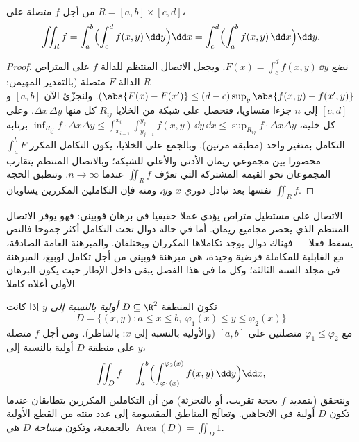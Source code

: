 \begin{theorem}\label{thm:b2:multint:fubini}
من أجل $f$ متصلة على $R = [a,b] \times [c,d]$،
\[
\iint_R f
= \int_a^b \Bigl(\int_c^d f(x, y)\,\dd y\Bigr)\dd x
= \int_c^d \Bigl(\int_a^b f(x, y)\,\dd x\Bigr)\dd y .
\]
\end{theorem}

\begin{proof}
نضع $F(x) = \int_c^d f(x, y)\,\dd y$. ويجعل الاتصال المنتظم للدالة $f$ على المتراص
$R$ الدالة $F$ متصلة (بالتقدير المهيمن: $\abs{F(x) - F(x')} \leq (d - c)\sup_y\abs{f(x,y) - f(x',y)}$).
ولنجزّئ الآن $[a,b]$ و$[c,d]$ إلى $n$ جزءا متساويا، فنحصل على شبكة
من الخلايا $R_{ij}$  كل منها $\Delta x\,\Delta y$. وعلى كل خلية، $\inf_{R_{ij}} f \cdot \Delta x \Delta y \leq
\int_{x_{i-1}}^{x_i}\int_{y_{j-1}}^{y_j} f(x,y)\,\dd y\,\dd x \leq
\sup_{R_{ij}} f \cdot \Delta x \Delta y$
برتابة التكامل بمتغير واحد (مطبقة مرتين). وبالجمع على الخلايا، يكون
التكامل المكرر $\int_a^b F$ محصورا بين مجموعي ريمان الأدنى والأعلى
للشبكة؛ وبالاتصال المنتظم يتقارب المجموعان نحو القيمة المشتركة
التي تعرّف $\iint_R f$ عندما $n \to
\infty$. وتنطبق الحجة نفسها بعد تبادل دوري
$x$ و$y$، ومنه فإن التكاملين المكررين يساويان $\iint_R f$.
\end{proof}

\begin{remark}
الاتصال على مستطيل متراص يؤدي عملا حقيقيا في برهان فوبيني: فهو
يوفر الاتصال المنتظم الذي يحصر مجاميع ريمان. أما في حالة دوال تحت
التكامل أكثر جموحا فالنص يسقط فعلا --- فهناك دوال يوجد تكاملاها
المكرران ويختلفان. والمبرهنة العامة الصادقة، مع القابلية للمكاملة
فرضية وحيدة، هي مبرهنة فوبيني من أجل تكامل لوبيغ، المبرهنة في مجلد
السنة الثالثة؛ وكل ما في هذا الفصل يبقى داخل الإطار  حيث
يكون البرهان الأولي أعلاه كاملا.
\end{remark}

\begin{definition}\label{def:b2:multint:domain}
تكون المنطقة $D \subseteq \R^2$ \emph{أولية بالنسبة إلى $y$} إذا كانت
\[
D = \{(x, y) : a \leq x \leq b,\
\varphi_1(x) \leq y \leq \varphi_2(x)\}
\]
مع $\varphi_1 \leq \varphi_2$ متصلتين على $[a,b]$ (والأولية بالنسبة إلى $x$:
بالتناظر). ومن أجل $f$ متصلة على منطقة $D$ أولية بالنسبة إلى
$y$،
\[
\iint_D f
= \int_a^b\Bigl(
\int_{\varphi_1(x)}^{\varphi_2(x)} f(x,y)\,\dd y\Bigr)\dd x ,
\]
ونتحقق (بتمديد $f$ بحجة تقريب، أو بالتجزئة) من أن التكاملين
المكررين يتطابقان عندما تكون $D$ أولية في الاتجاهين. وتعالَج
المناطق المقسومة إلى عدد منته من القطع الأولية بالجمعية، وتكون
\emph{مساحة} $D$ هي $\operatorname
{Area}(D) = \iint_D 1$.
\end{definition}

